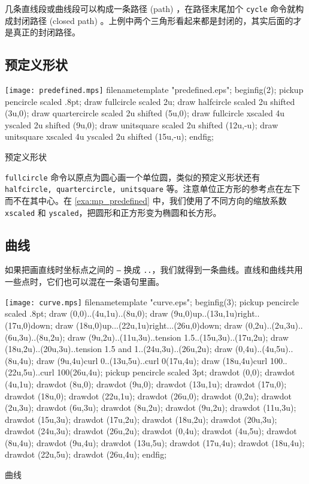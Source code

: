 几条直线段或曲线段可以构成一条路径 (path) ，在路径末尾加个 \texttt{cycle} 命令就构成封闭路径 (closed path) 。上例中两个三角形看起来都是封闭的，其实后面的才是真正的封闭路径。

\subsection{预定义形状}

\begin{example}[htbp]
\begin{FBTDemo}[numbers=left]{\texttt{[image: predefined.mps]}}
filenametemplate "predefined.eps";
beginfig(2);
pickup pencircle scaled .8pt;
draw fullcircle scaled 2u;
draw halfcircle scaled 2u shifted (3u,0);
draw quartercircle scaled 2u shifted (5u,0);
draw fullcircle xscaled 4u yscaled 2u shifted (9u,0);
draw unitsquare scaled 2u shifted (12u,-u);
draw unitsquare xscaled 4u yscaled 2u shifted (15u,-u);
endfig;
\end{FBTDemo}
\vspace{1em}
\caption{\MP 预定义形状}
\label{exa:mp_predefined}
\end{example}

\texttt{fullcircle} 命令以原点为圆心画一个单位圆，类似的预定义形状还有 \texttt{halfcircle, quartercircle, unitsquare} 等。注意单位正方形的参考点在左下而不在其中心。在 \autoref{exa:mp_predefined} 中，我们使用了不同方向的缩放系数 \texttt{xscaled} 和 \texttt{yscaled}，把圆形和正方形变为椭圆和长方形。

\subsection{曲线}

如果把画直线时坐标点之间的 \texttt{--} 换成 \texttt{..}，我们就得到一条曲线。直线和曲线共用一些点时，它们也可以混在一条语句里画。

\begin{example}[htbp]
\begin{FBTDemo}[numbers=left]{\texttt{[image: curve.mps]}}
filenametemplate "curve.eps";
beginfig(3);
pickup pencircle scaled .8pt;
draw (0,0)..(4u,1u)..(8u,0);
draw (9u,0){up}..(13u,1u){right}..(17u,0){down};
draw (18u,0){up}...(22u,1u){right}...(26u,0){down};
draw (0,2u)..(2u,3u)..(6u,3u)..(8u,2u);
draw (9u,2u)..(11u,3u)..tension 1.5..(15u,3u)..(17u,2u);
draw (18u,2u)..(20u,3u)..tension 1.5 
  and 1..(24u,3u)..(26u,2u);
draw (0,4u)..(4u,5u)..(8u,4u);
draw (9u,4u){curl 0}..(13u,5u)..{curl 0}(17u,4u);
draw (18u,4u){curl 100}..(22u,5u)..{curl 100}(26u,4u);
pickup pencircle scaled 3pt;
drawdot (0,0); drawdot (4u,1u); drawdot (8u,0);
drawdot (9u,0); drawdot (13u,1u); drawdot (17u,0);
drawdot (18u,0); drawdot (22u,1u); drawdot (26u,0);
drawdot (0,2u); drawdot (2u,3u); drawdot (6u,3u); 
  drawdot (8u,2u);
drawdot (9u,2u); drawdot (11u,3u); drawdot (15u,3u); 
  drawdot (17u,2u);
drawdot (18u,2u); drawdot (20u,3u); drawdot (24u,3u); 
  drawdot (26u,2u);
drawdot (0,4u); drawdot (4u,5u); drawdot (8u,4u);
drawdot (9u,4u); drawdot (13u,5u); drawdot (17u,4u);
drawdot (18u,4u); drawdot (22u,5u); drawdot (26u,4u);
endfig;
\end{FBTDemo}
\caption{\MP 曲线}
\label{exa:mp_curve}
\end{example}


